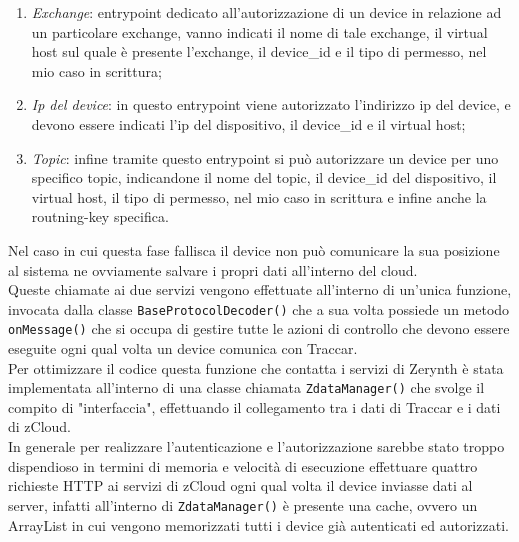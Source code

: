 \documentclass[a4paper,titlepage,12pt]{report}
\begin{document}
{\begin{enumerate}
\item \textit{Exchange}: entrypoint dedicato all'autorizzazione di un device in relazione ad un particolare exchange, vanno indicati il nome di tale exchange, il virtual host sul quale è presente l'exchange, il device\_id e il tipo di permesso, nel mio caso in scrittura;

\item \textit{Ip del device}: in questo entrypoint viene autorizzato l'indirizzo ip del device, e devono essere indicati l'ip del dispositivo, il device\_id e il virtual host;

\item \textit{Topic}: infine tramite questo entrypoint si può autorizzare un device per uno specifico topic, indicandone il nome del topic, il device\_id del dispositivo, il virtual host, il tipo di permesso, nel mio caso in scrittura e infine anche la routning-key specifica.

\end{enumerate}


Nel caso in cui questa fase fallisca il device non può comunicare la sua posizione al sistema ne ovviamente salvare i propri dati all'interno del cloud. \\
Queste chiamate ai due servizi vengono effettuate all'interno di un'unica funzione, invocata dalla classe \texttt{BaseProtocolDecoder()} che a sua volta possiede un metodo \texttt{onMessage()} che si occupa di gestire tutte le azioni di controllo che devono essere eseguite ogni qual volta un device comunica con Traccar.\\
Per ottimizzare il codice questa funzione che contatta i servizi di Zerynth è stata implementata all'interno di una classe chiamata \texttt{ZdataManager()} che svolge il compito di "interfaccia", effettuando il collegamento tra i dati di Traccar e i dati di zCloud. \\
In generale per realizzare l'autenticazione e l'autorizzazione sarebbe stato troppo dispendioso in termini di memoria e velocità di esecuzione effettuare quattro richieste HTTP ai servizi di zCloud ogni qual volta il device inviasse dati al server, infatti all'interno di \texttt{ZdataManager()} è presente una cache, ovvero un ArrayList in cui vengono memorizzati tutti i device già autenticati ed autorizzati. 

}
\end{document}
